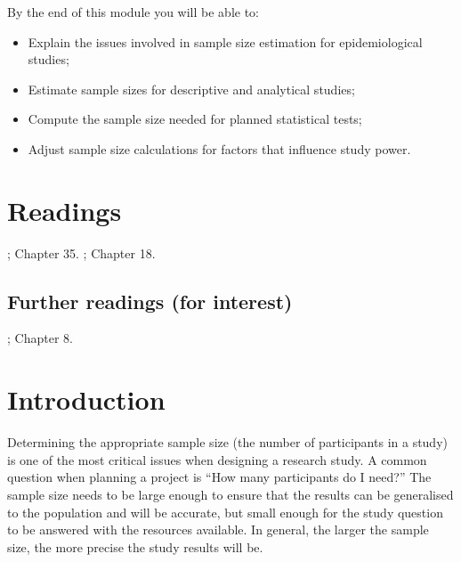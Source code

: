 \documentclass[
]{memoir}
\providecommand{\tightlist}{%
  \setlength{\itemsep}{0pt}\setlength{\parskip}{0pt}}
\begin{document}
By the end of this module you will be able to:

\begin{itemize}
\tightlist
\item
  Explain the issues involved in sample size estimation for epidemiological studies;
\item
  Estimate sample sizes for descriptive and analytical studies;
\item
  Compute the sample size needed for planned statistical tests;
\item
  Adjust sample size calculations for factors that influence study power.
\end{itemize}

\hypertarget{readings-9}{%
\section*{Readings}\label{readings-9}}

\citet{kirkwood_sterne01a}; Chapter 35.
\citet{bland15b}; Chapter 18.

\hypertarget{further-readings-for-interest}{%
\subsection*{Further readings (for interest)}\label{further-readings-for-interest}}

\citet{woodward13}; Chapter 8.

\hypertarget{introduction-8}{%
\section{Introduction}\label{introduction-8}}

Determining the appropriate sample size (the number of participants in a study) is one of the most critical issues when designing a research study. A common question when planning a project is ``How many participants do I need?'' The sample size needs to be large enough to ensure that the results can be generalised to the population and will be accurate, but small enough for the study question to be answered with the resources available. In general, the larger the sample size, the more precise the study results will be.
\end{document}
